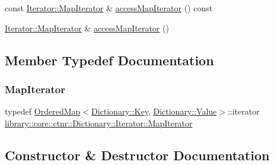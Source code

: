\begin{DoxyCompactItemize}
\item 
const \mbox{\hyperlink{classlibrary_1_1core_1_1ctnr_1_1_dictionary_1_1_iterator_a990205e908ac1bafcd754993219b805e}{Iterator\+::\+Map\+Iterator}} \& \mbox{\hyperlink{classlibrary_1_1core_1_1ctnr_1_1_dictionary_1_1_iterator_ac6f24ef08aadc9db47e6b68678548465}{access\+Map\+Iterator}} () const
\item 
\mbox{\hyperlink{classlibrary_1_1core_1_1ctnr_1_1_dictionary_1_1_iterator_a990205e908ac1bafcd754993219b805e}{Iterator\+::\+Map\+Iterator}} \& \mbox{\hyperlink{classlibrary_1_1core_1_1ctnr_1_1_dictionary_1_1_iterator_ad99c0605d7bcf97420bb6ac2d35fedd9}{access\+Map\+Iterator}} ()
\end{DoxyCompactItemize}


\subsection{Member Typedef Documentation}
\mbox{\label{classlibrary_1_1core_1_1ctnr_1_1_dictionary_1_1_iterator_a990205e908ac1bafcd754993219b805e}} 
\subsubsection{\texorpdfstring{MapIterator}{MapIterator}}
{\footnotesize\ttfamily typedef \mbox{\hyperlink{namespacelibrary_1_1core_1_1ctnr_a1c0809231c3bc9fccce602bd7941a36b}{Ordered\+Map}}$<$\mbox{\hyperlink{classlibrary_1_1core_1_1ctnr_1_1_dictionary_a987cae687cce70d81a2a483c5e05e842}{Dictionary\+::\+Key}}, \mbox{\hyperlink{classlibrary_1_1core_1_1ctnr_1_1_dictionary_a3baf6692694e4fc27cb399ac083c88ea}{Dictionary\+::\+Value}}$>$\+::iterator \mbox{\hyperlink{classlibrary_1_1core_1_1ctnr_1_1_dictionary_1_1_iterator_a990205e908ac1bafcd754993219b805e}{library\+::core\+::ctnr\+::\+Dictionary\+::\+Iterator\+::\+Map\+Iterator}}}



\subsection{Constructor \& Destructor Documentation}
\mbox{\label{classlibrary_1_1core_1_1ctnr_1_1_dictionary_1_1_iterator_aa058bf5cb2ff90c93bb3de0925483453}} 
